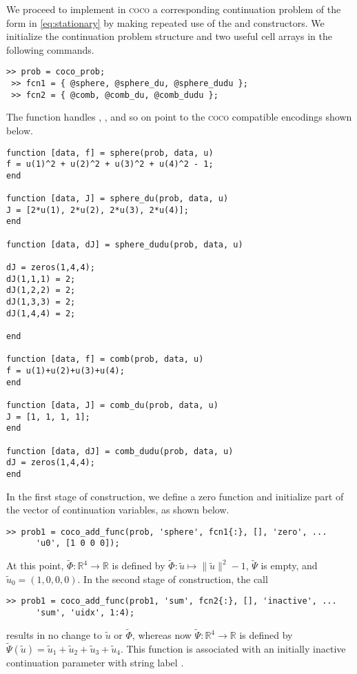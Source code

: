 We proceed to implement in \textsc{coco} a corresponding continuation problem of the form in \eqref{eq:stationary} by making repeated use of the  and  constructors. We initialize the continuation problem structure and two useful cell arrays in the following commands.
\begin{lstlisting}[language=coco-highlight]
 >> prob = coco_prob;
 >> fcn1 = { @sphere, @sphere_du, @sphere_dudu };
 >> fcn2 = { @comb, @comb_du, @comb_dudu };
\end{lstlisting}
 The function handles , , and so on point to the \textsc{coco} compatible encodings shown below.
\begin{lstlisting}[language=coco-highlight]
function [data, f] = sphere(prob, data, u)
f = u(1)^2 + u(2)^2 + u(3)^2 + u(4)^2 - 1;
end

function [data, J] = sphere_du(prob, data, u)
J = [2*u(1), 2*u(2), 2*u(3), 2*u(4)];
end

function [data, dJ] = sphere_dudu(prob, data, u)

dJ = zeros(1,4,4);
dJ(1,1,1) = 2;
dJ(1,2,2) = 2;
dJ(1,3,3) = 2;
dJ(1,4,4) = 2;

end

function [data, f] = comb(prob, data, u)
f = u(1)+u(2)+u(3)+u(4);
end

function [data, J] = comb_du(prob, data, u)
J = [1, 1, 1, 1];
end

function [data, dJ] = comb_dudu(prob, data, u)
dJ = zeros(1,4,4);
end
\end{lstlisting}
In the first stage of construction, we define a zero function and initialize part of the vector of continuation variables, as shown below.
\begin{lstlisting}[language=coco-highlight]
>> prob1 = coco_add_func(prob, 'sphere', fcn1{:}, [], 'zero', ...
      'u0', [1 0 0 0]);
\end{lstlisting}
At this point, $\tilde{\Phi}:\mathbb{R}^4\rightarrow\mathbb{R}$ is defined by $\tilde{\Phi}:\tilde{u}\mapsto\|\tilde{u}\|^2-1$, $\tilde{\Psi}$ is empty, and $\tilde{u}_0=(1,0,0,0)$. In the second stage of construction, the call 
\begin{lstlisting}[language=coco-highlight]
>> prob1 = coco_add_func(prob1, 'sum', fcn2{:}, [], 'inactive', ...
      'sum', 'uidx', 1:4);
\end{lstlisting}
results in no change to $\tilde{u}$ or $\tilde{\Phi}$, whereas now $\tilde{\Psi}:\mathbb{R}^4\rightarrow\mathbb{R}$ is defined by $\tilde{\Psi}(\tilde{u})=\tilde{u}_1+\tilde{u}_2+\tilde{u}_3+\tilde{u}_4$. This function is associated with an initially inactive continuation parameter with string label .

